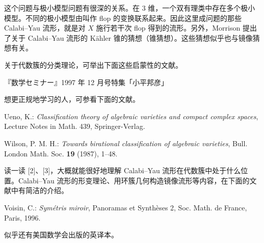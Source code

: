 这个问题与极小模型问题有很深的关系。在 3 维，一个双有理类中存在多个极小模型。不同的极小模型由叫作 flop 的变换联系起来。因此这里成问题的那些 Calabi--Yau 流形，就是对 $X$ 施行若干次 flop 得到的流形。另外，Morrison 提出了关于 Calabi--Yau 流形的 Kähler 锥的猜想（锥猜想）。这些猜想似乎也与镜像猜想有关。

\begin{reflist}
  \item[{}] 关于代数簇的分类理论，可举出下面这些启蒙性的文献。
  \item[{[1]}] 『数学セミナー』1997 年 12 月号特集「小平邦彦」
  \item[{}] 想更正规地学习的人，可参看下面的文献。
  \item[{[2]}] Ueno, K.: \textit{Classification theory of algebraic varieties and compact complex spaces}, Lecture Notes in Math. 439, Springer-Verlag.
  \item[{[3]}] Wilson, P. M. H.: \textit{Towards birational classification of algebraic varieties}, Bull. London Math. Soc. \textbf{19} (1987), 1--48.
  \item[{}] 读一读 [2]、[3]，大概就能很好地理解 Calabi--Yau 流形在代数簇中处于什么位置。Calabi--Yau 流形的形变理论、用环簇几何构造镜像流形等内容，在下面的文献中有简洁的介绍。
  \item[{[4]}] Voisin, C.: \textit{Symétris miroir}, Panoramas et Synthèses 2, Soc. Math. de France, Paris, 1996.
  \item[{}] [4] 似乎还有美国数学会出版的英译本。
\end{reflist}

\renewcommand{\thesection}{\Roman{section}}

